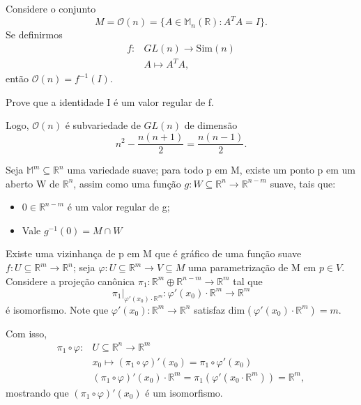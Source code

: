 \documentclass[../differential_topology.tex]{subfiles}
\begin{document}
\begin{example}
	Considere o conjunto
	\[
		M = \mathcal{O}(n) = \{A\in \mathbb{M}_{n}(\mathbb{R}): A^{T}A = I\}.
	\]
	Se definirmos
	\begin{align*}
		f: & GL(n)\rightarrow \mathrm{Sim}(n) \\
		   & A\longmapsto A^{T}A,
	\end{align*}
	então \(\mathcal{O}(n) = f^{-1}(I)\).
	\begin{exr}
		Prove que a identidade I é um valor regular de f.
	\end{exr}
	Logo, \(\mathcal{O}(n)\) é subvariedade de \(GL(n)\) de dimensão
	\[
		n^{2} - \frac{n(n+1)}{2}=\frac{n(n-1)}{2}.
	\]
\end{example}
\begin{theorem*}
	Seja \(\mathbb{M}^{m}\subseteq \mathbb{R}^{n}\) uma variedade suave; para todo p em M, existe um ponto p em um aberto W de \(\mathbb{R}^{n}\), assim como uma função \(g:W\subseteq \mathbb{R}^{n}\rightarrow \mathbb{R}^{n-m}\) suave, tais que:
	\begin{itemize}
		\item[i)] \(0\in \mathbb{R}^{n-m}\) é um valor regular de g;
		\item[ii)] Vale \(g^{-1}(0) = M \cap W\)
	\end{itemize}
\end{theorem*}
\begin{proof*}
	Existe uma vizinhança de p em M que é gráfico de uma função suave \(f:U\subseteq \mathbb{R}^{m}\rightarrow \mathbb{R}^{n}\); seja \(\varphi :U\subseteq \mathbb{R}^{m}\rightarrow V\subseteq M\) uma parametrização de M em \(p\in V\).
	Considere a projeção canônica \(\pi_{1}:\mathbb{R}^{m}\oplus \mathbb{R}^{n-m} \rightarrow \mathbb{R}^{m}\) tal que
	\[
		\pi_1|_{\varphi '(x_{0})\cdot \mathbb{R}^{m}}:\varphi '(x_{0})\cdot \mathbb{R}^{m}\rightarrow \mathbb{R}^{m}
	\]
	é isomorfismo.
	Note que \(\varphi '(x_{0}):\mathbb{R}^{m}\rightarrow \mathbb{R}^{n}\) satisfaz \(\mathrm{dim}_{}(\varphi '(x_{0})\cdot \mathbb{R}^{m})=m\).

	Com isso,
	\begin{align*}
		\pi_1\circ \varphi : & U\subseteq \mathbb{R}^{n}\rightarrow\mathbb{R}^{m}                                                              \\
		                     & x_{0}\longmapsto (\pi_1\circ \varphi)'(x_{0})=  \pi_1\circ \varphi'(x_{0})                                      \\
		                     & (\pi_1\circ \varphi )'(x_{0})\cdot \mathbb{R}^{m}=\pi_1(\varphi '(x_{0}\cdot \mathbb{R}^{m})) = \mathbb{R}^{m},
	\end{align*}
	mostrando que \((\pi_1\circ \varphi )'(x_{0})\) é um isomorfismo.

\end{proof*}
\end{document}
